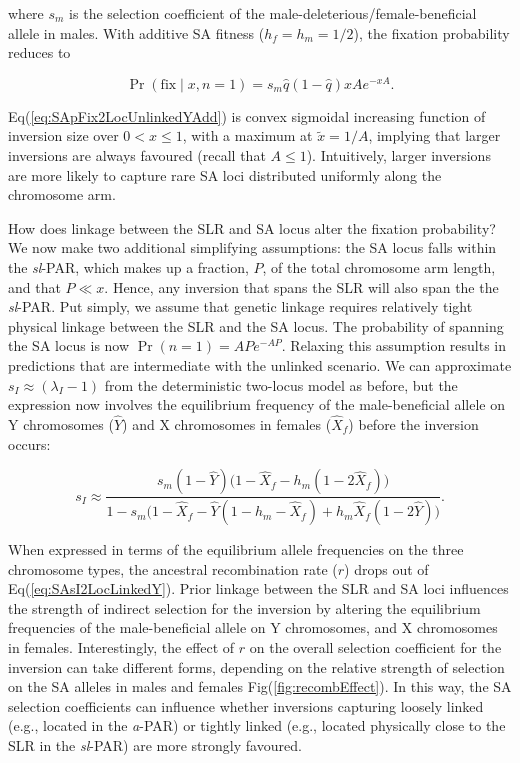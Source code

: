 \documentclass{article}[12pt]
\begin{document}
\noindent where $s_m$ is the selection coefficient of the male-deleterious/female-beneficial allele in males. With additive SA fitness ($h_f = h_m = 1/2$), the fixation probability reduces to

\begin{equation}\label{eq:SApFix2LocUnlinkedYAdd}
	\Pr(\text{fix} \mid x,n=1) = s_m \hat{q}(1 - \hat{q}) xA e^{-xA}.
\end{equation}

\noindent Eq(\ref{eq:SApFix2LocUnlinkedYAdd}) is convex sigmoidal increasing function of inversion size over $0 < x \leq 1$, with a maximum at $\tilde{x} = 1/A $, implying that larger inversions are always favoured (recall that $A \leq 1 $). Intuitively, larger inversions are more likely to capture rare SA loci distributed uniformly along the chromosome arm.

How does linkage between the SLR and SA locus alter the fixation probability? We now make two additional simplifying assumptions: the SA locus falls within the {\itshape sl}-PAR, which makes up a fraction, $P$, of the total chromosome arm length, and that $P \ll x$. Hence, any inversion that spans the SLR will also span the the {\itshape sl}-PAR. Put simply, we assume that genetic linkage requires relatively tight physical linkage between the SLR and the SA locus. The probability of spanning the SA locus is now $\Pr(n = 1) = AP e^{-AP}$. Relaxing this assumption results in predictions that are intermediate with the unlinked scenario. We can approximate $s_I \approx (\lambda_I - 1)$ from the deterministic two-locus model as before, but the expression now involves the equilibrium frequency of the male-beneficial allele on Y chromosomes ($\hat{Y}$) and X chromosomes in females ($\hat{X}_f$) before the inversion occurs:

\begin{equation}\label{eq:SAsI2LocLinkedY}
	s_I \approx \frac{ s_m(1 - \hat{Y}) \big( 1 - \hat{X}_f - h_m(1 - 2\hat{X}_f) \big)} { 1 - s_m \big(1 - \hat{X}_f - \hat{Y}(1 - h_m - \hat{X}_f) + h_m \hat{X}_f(1 - 2 \hat{Y}) \big) }.
\end{equation}

\noindent When expressed in terms of the equilibrium allele frequencies on the three chromosome types, the ancestral recombination rate ($r$) drops out of Eq(\ref{eq:SAsI2LocLinkedY}). Prior linkage between the SLR and SA loci influences the strength of indirect selection for the inversion by altering the equilibrium frequencies of the male-beneficial allele on Y chromosomes, and X chromosomes in females. Interestingly, the effect of $r$ on the overall selection coefficient for the inversion can take different forms, depending on the relative strength of selection on the SA alleles in males and females Fig(\ref{fig:recombEffect}). In this way, the SA selection coefficients can influence whether inversions capturing loosely linked (e.g., located in the {\itshape a}-PAR) or tightly linked (e.g., located physically close to the SLR in the {\itshape sl}-PAR) are more strongly favoured.
\end{document}
